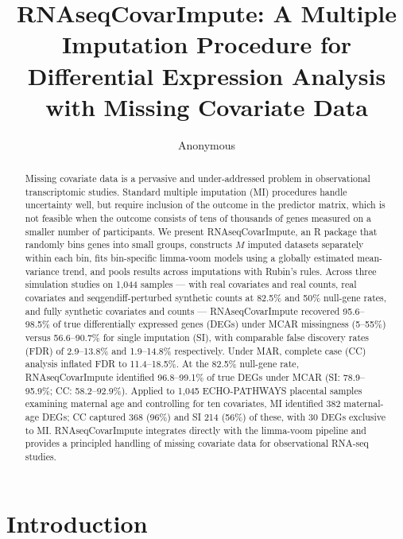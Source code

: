\documentclass[11pt]{article}
\title{RNAseqCovarImpute: A Multiple Imputation Procedure for \\ Differential Expression Analysis with Missing Covariate Data}
\author{Anonymous}
\date{}
\begin{document}
\maketitle

\begin{abstract}
Missing covariate data is a pervasive and under-addressed problem in observational transcriptomic studies. Standard multiple imputation (MI) procedures handle uncertainty well, but require inclusion of the outcome in the predictor matrix, which is not feasible when the outcome consists of tens of thousands of genes measured on a smaller number of participants. We present RNAseqCovarImpute, an R package that randomly bins genes into small groups, constructs $M$ imputed datasets separately within each bin, fits bin-specific limma-voom models using a globally estimated mean-variance trend, and pools results across imputations with Rubin's rules. Across three simulation studies on 1,044 samples --- with real covariates and real counts, real covariates and seqgendiff-perturbed synthetic counts at 82.5\% and 50\% null-gene rates, and fully synthetic covariates and counts --- RNAseqCovarImpute recovered 95.6--98.5\% of true differentially expressed genes (DEGs) under MCAR missingness (5--55\%) versus 56.6--90.7\% for single imputation (SI), with comparable false discovery rates (FDR) of 2.9--13.8\% and 1.9--14.8\% respectively. Under MAR, complete case (CC) analysis inflated FDR to 11.4--18.5\%. At the 82.5\% null-gene rate, RNAseqCovarImpute identified 96.8--99.1\% of true DEGs under MCAR (SI: 78.9--95.9\%; CC: 58.2--92.9\%). Applied to 1,045 ECHO-PATHWAYS placental samples examining maternal age and controlling for ten covariates, MI identified 382 maternal-age DEGs; CC captured 368 (96\%) and SI 214 (56\%) of these, with 30 DEGs exclusive to MI. RNAseqCovarImpute integrates directly with the limma-voom pipeline and provides a principled handling of missing covariate data for observational RNA-seq studies.
\end{abstract}

\section{Introduction}
\end{document}
